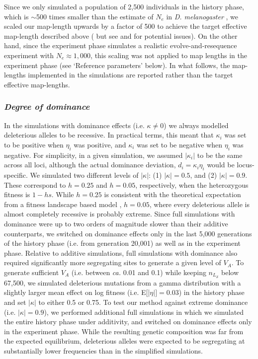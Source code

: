 \documentclass[12pt]{article}
\begin{document}
\begin{bibunit}
Since we only simulated a population of 2,500 individuals in the history phase, which is $\sim$500 times smaller than the estimate of $N_e$ in \emph{D. melanogaster} \citep{campos2013codon, campos2019effects}, we scaled our map-length upwards by a factor of 500 to achieve the target effective map-length described above (\citet{campos2019effects} but see \citet{dabi2025population} and \citet{ferrari2025parameter} for potential issues). On the other hand, since the experiment phase simulates a realistic evolve-and-resequence experiment with $N_e \approx 1,000$, this scaling was not applied to map lengths in the experiment phase (see `Reference parameters' below). In what follows, the map-lengths implemented in the simulations are reported rather than the target effective map-lengths. 

\subsubsection*{\textit{Degree of dominance}}

In the simulations with dominance effects (i.e. $\kappa \neq 0$) we always modelled deleterious alleles to be recessive. In practical terms, this meant that ${\kappa}_i$ was set to be positive when $\eta_i$ was positive, and ${\kappa}_i$ was set to be negative when $\eta_i$ was negative. For simplicity, in a given simulation, we assumed $|\kappa_i|$ to be the same across all loci, although the actual dominance deviation, $d_i = \kappa_i \eta_i$ would be locus-specific. We simulated two different levels of $|\kappa|$: (1) $|\kappa| = 0.5$, and (2) $|\kappa| = 0.9$.  These correspond to $h=0.25$ and $h=0.05$, respectively, when the heterozygous fitness is $1 - hs$. While $h=0.25$ is consistent with the theoretical expectation from a fitness landscape based model \citep{manna2011fitness}, $h = 0.05$, where every deleterious allele is almost completely recessive is probably extreme. Since full simulations with dominance were up to two orders of magnitude slower than their additive counterparts, we switched on dominance effects only in the last 5,000 generations of the history phase (i.e. from generation 20,001) as well as in the experiment phase. Relative to additive simulations, full simulations with dominance also required significantly more segregating sites to generate a given level of $V_A$. To generate sufficient $V_A$ (i.e. between \emph{ca.} 0.01 and 0.1) while keeping $n_{L_\mathcal{S}}$ below 67,500, we simulated deleterious mutations from a gamma distribution with a slightly larger mean effect on log fitness (i.e. E[|$\eta|] = 0.03$) in the history phase and set $|\kappa|$ to either 0.5 or 0.75. To test our method against extreme dominance (i.e. $|\kappa| = 0.9$), we performed additional full simulations in which  we simulated the entire history phase under additivity, and switched on dominance effects only in the experiment phase. While the resulting genetic composition was far from the expected equilibrium, deleterious alleles were expected to be segregating at substantially lower frequencies than in the simplified simulations.  


\end{bibunit}
\end{document}
